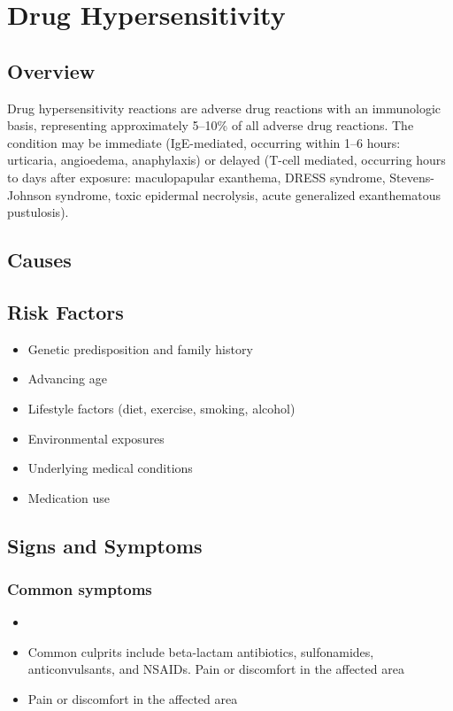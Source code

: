 \chapter{Drug Hypersensitivity}
\label{sec:Drug Hypersensitivity}

\section{Overview}
Drug hypersensitivity reactions are adverse drug reactions with an immunologic basis, representing approximately 5--10\% of all adverse drug reactions. The condition may be immediate (IgE-mediated, occurring within 1--6 hours: urticaria, angioedema, anaphylaxis) or delayed (T-cell mediated, occurring hours to days after exposure: maculopapular exanthema, DRESS syndrome, Stevens-Johnson syndrome, toxic epidermal necrolysis, acute generalized exanthematous pustulosis).
\section{Causes}
\section{Risk Factors}

\begin{itemize}[noitemsep]
  \item Genetic predisposition and family history
  \item Advancing age
  \item Lifestyle factors (diet, exercise, smoking, alcohol)
  \item Environmental exposures
  \item Underlying medical conditions
  \item Medication use
\end{itemize}
\section{Signs and Symptoms}

\subsection{Common symptoms}
\begin{itemize}[noitemsep]
  \item \item Common culprits include beta-lactam antibiotics, sulfonamides, anticonvulsants, and NSAIDs. Pain or discomfort in the affected area    \item Pain or discomfort in the affected area
  \end{itemize}


